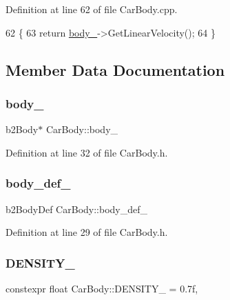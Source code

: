 Definition at line 62 of file Car\+Body.\+cpp.


\begin{DoxyCode}
62                                         \{
63     \textcolor{keywordflow}{return} \hyperlink{classCarBody_aa460930fa1548d1987051dfa6f68c897}{body\_}->GetLinearVelocity();
64 \}
\end{DoxyCode}


\subsection{Member Data Documentation}
\mbox{\label{classCarBody_aa460930fa1548d1987051dfa6f68c897}} 
\subsubsection{\texorpdfstring{body\+\_\+}{body\_}}
{\footnotesize\ttfamily b2\+Body$\ast$ Car\+Body\+::body\+\_\+\hspace{0.3cm}{\ttfamily [private]}}



Definition at line 32 of file Car\+Body.\+h.

\mbox{\label{classCarBody_a304e0ab7625f9673e4f25c7c52cfd3f8}} 
\subsubsection{\texorpdfstring{body\+\_\+def\+\_\+}{body\_def\_}}
{\footnotesize\ttfamily b2\+Body\+Def Car\+Body\+::body\+\_\+def\+\_\+\hspace{0.3cm}{\ttfamily [private]}}



Definition at line 29 of file Car\+Body.\+h.

\mbox{\label{classCarBody_a451074380bc9169117e9beb8303840fe}} 
\subsubsection{\texorpdfstring{D\+E\+N\+S\+I\+T\+Y\+\_\+}{DENSITY\_}}
{\footnotesize\ttfamily constexpr float Car\+Body\+::\+D\+E\+N\+S\+I\+T\+Y\+\_\+ = 0.\+7f\hspace{0.3cm}{\ttfamily [static]}, {\ttfamily [private]}}



